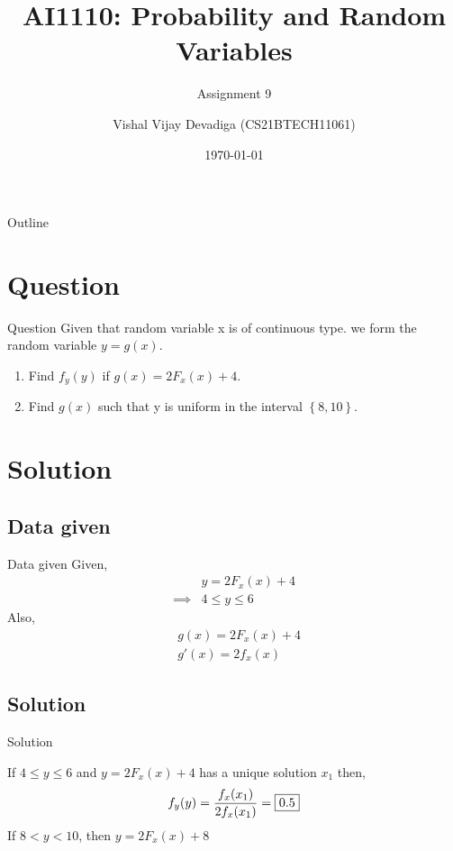 \documentclass{beamer}
\title{AI1110: Probability and Random Variables}
\subtitle{Assignment 9}
\author{Vishal Vijay Devadiga (CS21BTECH11061)}
\date{\today}
\providecommand{\cbrak}[1]{\ensuremath{\left\{#1\right\}}}
\begin{document}
\begin{frame}
    \titlepage
\end{frame}

\logo{}

\begin{frame}{Outline}
    \tableofcontents
\end{frame}

\section{Question}
\begin{frame}{Question}
    Given that random variable x is of continuous type. we form the random variable $y = g(x)$.
    \begin{enumerate}
        \item Find $f_y(y)$ if $g(x) = 2F_x(x) + 4$. 
        \item Find $g(x)$ such that y is uniform in the interval $\cbrak{8, 10}$. 
    \end{enumerate}
\end{frame}

\section{Solution}
\subsection{Data given}
\begin{frame}{Data given}
    Given,
    \begin{align}
        \label{eq:data}
        &y = 2F_x(x) + 4 
        \\
        \implies &4 \leq y \leq 6
    \end{align}
    Also,
    \begin{align}
        &g(x) = 2F_x(x) + 4 
        \\ 
        &g'(x) = 2f_x(x) 
    \end{align}
\end{frame}

\subsection{Solution}
\begin{frame}{Solution}

If $4 \leq y \leq 6$ and $y = 2F_x(x) + 4$ has a unique solution $x_1$ then,
\begin{align}
    f_y(y) = \frac{f_x(x_1)}{2f_x(x_1)} = \fbox{0.5}
\end{align}
If $8 < y < 10$, then $y = 2F_x(x) + 8$
\end{frame} 
\end{document}
